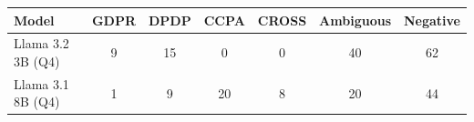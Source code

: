 \begin{tabular}{@{}lcccccc@{}}
\toprule
Model & GDPR & DPDP & CCPA & CROSS & Ambiguous & Negative \\
\midrule
Llama 3.2 3B (Q4) & 9 & 15 & 0 & 0 & 40 & 62 \\
Llama 3.1 8B (Q4) & 1 & 9 & 20 & 8 & 20 & 44 \\
\bottomrule
\end{tabular}